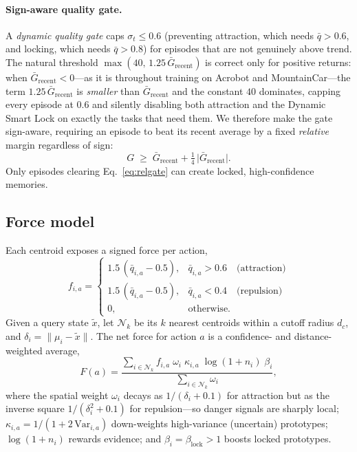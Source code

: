 \documentclass[11pt]{article}
\newcommand{\Fforce}{F}
\begin{document}
\paragraph{Sign-aware quality gate.} A \emph{dynamic quality gate} caps
$\sigma_t\le 0.6$ (preventing attraction, which needs $\bar q>0.6$, and locking,
which needs $\bar q>0.8$) for episodes that are not genuinely above trend. The
natural threshold $\max(40,\,1.25\,\bar G_{\text{recent}})$ is correct only for
positive returns: when $\bar G_{\text{recent}}<0$---as it is throughout training
on Acrobot and MountainCar---the term $1.25\,\bar G_{\text{recent}}$ is
\emph{smaller} than $\bar G_{\text{recent}}$ and the constant $40$ dominates,
capping every episode at $0.6$ and silently disabling both attraction and the
Dynamic Smart Lock on exactly the tasks that need them. We therefore make the
gate sign-aware, requiring an episode to beat its recent average by a fixed
\emph{relative} margin regardless of sign:
\begin{equation}
G \;\ge\; \bar G_{\text{recent}} + \tfrac{1}{4}\,\bigl|\bar G_{\text{recent}}\bigr|.
\label{eq:relgate}
\end{equation}
Only episodes clearing Eq.~\eqref{eq:relgate} can create locked,
high-confidence memories.

\subsection{Force model}
Each centroid exposes a signed force per action,
\begin{equation}
f_{i,a}=
\begin{cases}
1.5\,(\bar q_{i,a}-0.5), & \bar q_{i,a}>0.6 \quad\text{(attraction)}\\[2pt]
1.5\,(\bar q_{i,a}-0.5), & \bar q_{i,a}<0.4 \quad\text{(repulsion)}\\[2pt]
0, & \text{otherwise.}
\end{cases}
\end{equation}
Given a query state $\tilde x$, let $\mathcal{N}_k$ be its $k$ nearest centroids
within a cutoff radius $d_c$, and $\delta_i=\lVert \mu_i-\tilde x\rVert$. The net
force for action $a$ is a confidence- and distance-weighted average,
\begin{equation}
\Fforce(a)=
\frac{\sum_{i\in\mathcal{N}_k} f_{i,a}\; \omega_i\; \kappa_{i,a}\;\log(1+n_i)\;\beta_i}
     {\sum_{i\in\mathcal{N}_k}\omega_i},
\label{eq:force}
\end{equation}
where the spatial weight $\omega_i$ decays as $1/(\delta_i+0.1)$ for attraction
but as the inverse square $1/(\delta_i^2+0.1)$ for repulsion---so danger signals
are sharply local; $\kappa_{i,a}=1/(1+2\,\mathrm{Var}_{i,a})$ down-weights
high-variance (uncertain) prototypes; $\log(1+n_i)$ rewards evidence; and
$\beta_i=\beta_{\mathrm{lock}}>1$ boosts locked prototypes.
\end{document}
